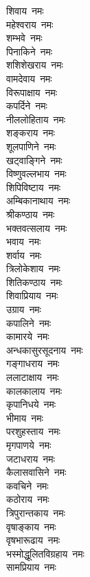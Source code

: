 \begin{multicols}{2}
\begin{flushleft}
शिवाय~नमः\\
महेश्वराय~नमः\\
शम्भवे~नमः\\
पिनाकिने~नमः\\
शशिशेखराय~नमः\\
वामदेवाय~नमः\\
विरूपाक्षाय~नमः\\
कपर्दिने~नमः\\
नीललोहिताय~नमः\\
शङ्कराय~नमः\hfill{}\\
शूलपाणिने~नमः\\
खट्वाङ्गिने~नमः\\
विष्णुवल्लभाय~नमः\\
शिपिविष्टाय~नमः\\
अम्बिकानाथाय~नमः\\
श्रीकण्ठाय~नमः\\
भक्तवत्सलाय~नमः\\
भवाय~नमः\\
शर्वाय~नमः\\
त्रिलोकेशाय~नमः\hfill{}\\
शितिकण्ठाय~नमः\\
शिवाप्रियाय~नमः\\
उग्राय~नमः\\
कपालिने~नमः\\
कामारये~नमः\\
अन्धकासुरसूदनाय~नमः\\
गङ्गाधराय~नमः\\
ललाटाक्षाय~नमः\\
कालकालाय~नमः\\
कृपानिधये~नमः\hfill{}\\
भीमाय~नमः\\
परशुहस्ताय~नमः\\
मृगपाणये~नमः\\
जटाधराय~नमः\\
कैलासवासिने~नमः\\
कवचिने~नमः\\
कठोराय~नमः\\
त्रिपुरान्तकाय~नमः\\
वृषाङ्काय~नमः\\
वृषभारूढाय~नमः\hfill{}\\
भस्मोद्धूलितविग्रहाय~नमः\\
सामप्रियाय~नमः\\

\end{flushleft}
\end{multicols}
